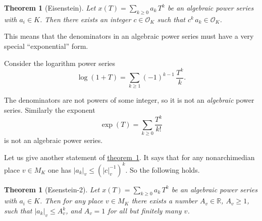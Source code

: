 \documentclass{article}
\newcommand{\refref}[2]{\hyperref[#2]{#1~\ref*{#2}}}
\newcommand{\examplesymbol}{$\blacktriangle$}
\renewcommand{\qedsymbol}{$\blacksquare$}
\theoremstyle{myplain}
\newtheorem{theorem}[proposition]{Theorem}
\theoremstyle{mydefinition}
\newenvironment{example}
  {\pushQED{\qed}\renewcommand{\qedsymbol}{\examplesymbol}\examplex}
  {\popQED\endexamplex}
\begin{document}
\begin{theorem}[Eisenstein]\label{theorem:eisenstein-1}
  Let $x (T) = \sum_{k \ge 0} a_k\,T^k$ be an algebraic power series with
  $a_i \in K$. Then there exists an integer $c \in \mathcal{O}_K$ such that
  $c^k \, a_k \in \mathcal{O}_K$.
\end{theorem}

This means that the denominators in an algebraic power series must have a very
special ``exponential'' form.

\begin{example}
  Consider the logarithm power series
  \[ \log (1+T) = \sum_{k \ge 1} (-1)^{k-1} \, \frac{T^k}{k}. \]

  The denominators are not powers of some integer, so it is not an
  \emph{algebraic} power series. Similarly the exponent
  $$\exp (T) = \sum_{k \ge 0} \frac{T^k}{k!}$$
  is not an algebraic power series.
\end{example}

Let us give another statement of \refref{theorem}{theorem:eisenstein-1}. It says
that for any nonarchimedian place $v \in M_K$ one has
$|a_k|_v \le (|c|_v^{-1})^k$. So the following holds.

\begin{theorem}[Esenstein-2]\label{theorem:eisenstein-2}
  Let $x (T) = \sum_{k \ge 0} a_k\,T^k$ be an algebraic power series with
  $a_i \in K$. Then for any place $v \in M_K$ there exists a number
  $A_v \in \mathbb{R}$, $A_v \ge 1$, such that $|a_k|_v \le A_v^k$, and
  $A_v = 1$ for all but finitely many $v$.
\end{theorem}
\end{document}
